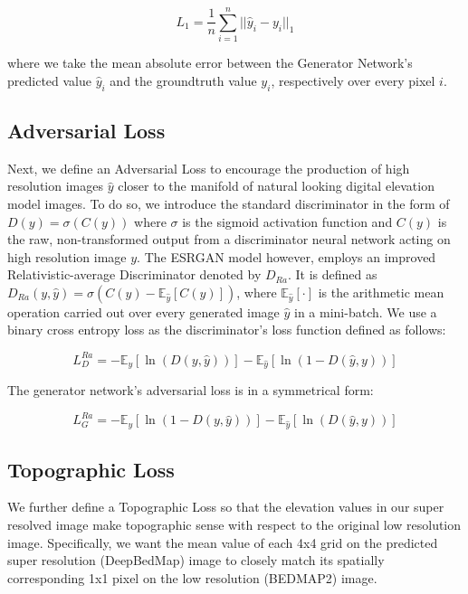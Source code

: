 \documentclass[tc, manuscript]{copernicus}
\begin{document}
\begin{equation}\label{eq:A1}
  L_1 = \dfrac{1}{n} \sum\limits_{i=1}^n ||\hat{y}_i - y_i||_{1}
\end{equation}

where we take the mean absolute error between the Generator Network's predicted value $\hat{y}_i$ and the groundtruth value $y_i$, respectively over every pixel $i$.

\subsection{Adversarial Loss}

Next, we define an Adversarial Loss to encourage the production of high resolution images $\hat{y}$ closer to the manifold of natural looking digital elevation model images.
To do so, we introduce the standard discriminator in the form of $D(y) = \sigma(C(y))$ where $\sigma$ is the sigmoid activation function and $C(y)$ is the raw, non-transformed output from a discriminator neural network acting on high resolution image $y$.
The ESRGAN model \citep{WangESRGANEnhancedSuperResolution2018} however, employs an improved Relativistic-average Discriminator \citep{Jolicoeur-Martineaurelativisticdiscriminatorkey2018} denoted by $D_{Ra}$.
It is defined as $D_{Ra}(y,\hat{y}) = \sigma(C(y) - \mathbb{E}_{\hat{y}}[C(\hat{y})])$, where $\mathbb{E}_{\hat{y}}[\cdot]$ is the arithmetic mean operation carried out over every generated image $\hat{y}$ in a mini-batch.
We use a binary cross entropy loss as the discriminator's loss function defined as follows:

\begin{equation}\label{eq:A2}
  L_D^{Ra} = - \mathbb{E}_y[\ln(D(y,\hat{y}))] - \mathbb{E}_{\hat{y}}[\ln(1 - D(\hat{y},y))]
\end{equation}

The generator network's adversarial loss is in a symmetrical form:

\begin{equation}\label{eq:A3}
  L_G^{Ra} = - \mathbb{E}_y[\ln(1 - D(y,\hat{y}))] - \mathbb{E}_{\hat{y}}[\ln(D(\hat{y},y))]
\end{equation}

\subsection{Topographic Loss}

We further define a Topographic Loss so that the elevation values in our super resolved image make topographic sense with respect to the original low resolution image.
Specifically, we want the mean value of each 4x4 grid on the predicted super resolution (DeepBedMap) image to closely match its spatially corresponding 1x1 pixel on the low resolution (BEDMAP2) image.
\end{document}
